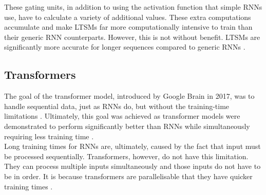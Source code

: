 \noindent
These gating units, in addition to using the activation function that simple RNNs use, have to calculate a variety
of additional values. These extra computations accumulate and make LTSMs far more computationally intensive to train than
their generic RNN counterparts. However, this is not without benefit. LTSMs are significantly more accurate for longer
sequences compared to generic RNNs \cite{sundermeyer2012lstm}.\\


\subsection{Transformers}

\noindent
The goal of the transformer model, introduced by Google Brain in 2017, was to handle sequential data, just as
RNNs do, but without the training-time limitations . Ultimately, this goal
was achieved as transformer models were demonstrated to perform significantly better than RNNs while
simultaneously requiring less training time \cite{DBLP:journals/corr/VaswaniSPUJGKP17}.\\

\noindent
Long training times for RNNs are, ultimately, caused by the fact that input must be processed sequentially.
Transformers, however, do not have this limitation.
They can process multiple inputs simultaneously and those inputs do not have to be in order.
It is because transformers are parallelisable that they have quicker training times \cite{DBLP:journals/corr/VaswaniSPUJGKP17}.\\

